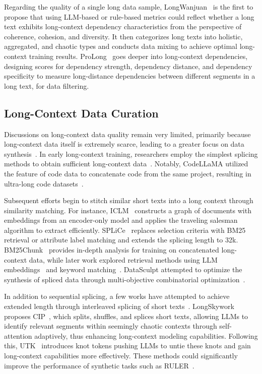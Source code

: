 Regarding the quality of a single long data sample, LongWanjuan~\citep{lv2024longwanjuan} is the first to propose that using LLM-based or rule-based metrics could reflect whether a long text exhibits long-context dependency characteristics from the perspective of coherence, cohesion, and diversity. It then categorizes long texts into holistic, aggregated, and chaotic types and conducts data mixing to achieve optimal long-context training results. ProLong~\citep{chen2024long} goes deeper into long-context dependencies, designing scores for dependency strength, dependency distance, and dependency specificity to measure long-distance dependencies between different segments in a long text, for data filtering.

\subsection{Long-Context Data Curation} 

Discussions on long-context data quality remain very limited, primarily because long-context data itself is extremely scarce, leading to a greater focus on data synthesis~\citep{chatglm2024glmlong}. In early long-context training, researchers employ the simplest splicing methods to obtain sufficient long-context data~\citep{chenlonglora,tworkowski2024focused,chenclex,li2023functional}. Notably, CodeLLaMA utilized the feature of code data to concatenate code from the same project, resulting in ultra-long code datasets~\citep{roziere2023code}.

Subsequent efforts begin to stitch similar short texts into a long context through similarity matching. For instance, ICLM~\citep{shicontext} constructs a graph of documents with embeddings from an encoder-only model and applies the traveling salesman algorithm to extract efficiently. SPLiCe~\citep{staniszewski2023structured} replaces selection criteria with BM25 retrieval or attribute label matching and extends the splicing length to 32k. BM25Chunk~\citep{zhao2024analysing} provides in-depth analysis for training on concatenated long-context data, while later work explored retrieval methods using LLM embeddings~\citep{chatglm2024glmlong} and keyword matching~\citep{gao2024quest}. DataSculpt attempted to optimize the synthesis of spliced data through multi-objective combinatorial optimization~\citep{lu2024datasculpt}.

In addition to sequential splicing, a few works have attempted to achieve extended length through interleaved splicing of short texts~\citep{zhao2024longskywork,tian2024untie}. LongSkywork proposes CIP~\citep{zhao2024longskywork}, which splits, shuffles, and splices short texts, allowing LLMs to identify relevant segments within seemingly chaotic contexts through self-attention adaptively, thus enhancing long-context modeling capabilities. Following this, UTK~\citep{tian2024untie} introduces knot tokens pushing LLMs to untie these knots and gain long-context capabilities more effectively. These methods could significantly improve the performance of synthetic tasks such as RULER~\citep{hsieh2024ruler}.

